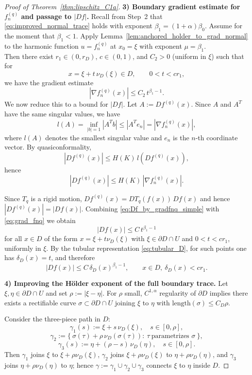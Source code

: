 \documentclass{amsart}
\begin{document}
\begin{proof}[Proof of Theorem~\ref{thm:lipschitz_C1a}]
\medskip
\noindent\textbf{3) Boundary gradient estimate for $f^{(q)}_n$ and passage to $|Df|$.}
Recall from Step~2 that \eqref{eq:improved_normal_trace} holds with exponent $\beta_1=(1+\alpha)\beta_0$.
Assume for the moment that $\beta_1<1$.
Apply Lemma~\ref{lem:anchored_holder_to_grad_normal} to the harmonic function $u=f^{(q)}_n$ at $x_0=\xi$
with exponent $\mu=\beta_1$.
\\
Then there exist
$r_1\in(0,r_D)$, $c\in(0,1)$, and $C_2>0$ (uniform in $\xi$) such that for
\[
x=\xi+t\,\nu_D(\xi)\in D,\qquad 0<t<c r_1,
\]
we have the gradient estimate
\begin{equation}\label{eq:grad_fnq}
|\nabla f^{(q)}_n(x)|\le C_2\, t^{\beta_1-1}.
\end{equation}
We now reduce this to a bound for $|Df|$. Let $A:=Df^{(q)}(x)$.
Since $A$ and $A^T$ have the same singular values, we have
\[
l(A)=\inf_{|b|=1}|A^Tb|\le |A^T e_n|=|\nabla f^{(q)}_n(x)|,
\]
where $l(A)$ denotes the smallest singular value and $e_n$ is the $n$-th coordinate vector. By quasiconformality,
\begin{equation}\label{eq:qc_distortion_again}
|Df^{(q)}(x)|\le H(K)\,l(Df^{(q)}(x)),
\end{equation}
hence
\begin{equation}\label{eq:Df_by_gradfnq_simple}
|Df^{(q)}(x)|\le H(K)\,|\nabla f^{(q)}_n(x)|.
\end{equation}

Since $T_q$ is a rigid motion, $Df^{(q)}(x)=DT_q(f(x))\,Df(x)$ and hence
$|Df^{(q)}(x)|=|Df(x)|$. Combining \eqref{eq:Df_by_gradfnq_simple} with
\eqref{eq:grad_fnq} we obtain
\[
|Df(x)|\le C\,t^{\beta_1-1}
\]
for all $x\in D$ of the form $x=\xi+t\nu_D(\xi)$ with $\xi\in\partial D\cap U$
and $0<t<c r_1$, uniformly in $\xi$. By the tubular representation
\eqref{eq:tubular_D}, for such points one has $\delta_D(x)=t$, and therefore
\begin{equation}\label{eq:Df_collar_in_terms_delta_new}
|Df(x)|\le C\,\delta_D(x)^{\beta_1-1},
\qquad x\in D,\ \delta_D(x)<c r_1.
\end{equation}


\medskip
\noindent\textbf{4) Improving the H\"older exponent of the full boundary trace.}
Let $\xi,\eta\in\partial D\cap U$ and set $\rho:=|\xi-\eta|$.
For $\rho$ small, $C^{1,\alpha}$ regularity of $\partial D$ implies there exists a rectifiable curve
$\sigma\subset \partial D\cap U$ joining $\xi$ to $\eta$ with $\mathrm{length}(\sigma)\le C_D\rho$.

Consider the three-piece path in $D$:
\[
\gamma_1(s):=\xi+s\,\nu_D(\xi),\quad s\in[0,\rho],
\]
\[
\gamma_2:=\{\ \sigma(\tau)+\rho\,\nu_D(\sigma(\tau)):\ \tau\ \text{parametrizes }\sigma\ \},
\]
\[
\gamma_3(s):=\eta+(\rho-s)\,\nu_D(\eta),\quad s\in[0,\rho].
\]
Then $\gamma_1$ joins $\xi$ to $\xi+\rho\nu_D(\xi)$, $\gamma_2$ joins $\xi+\rho\nu_D(\xi)$ to
$\eta+\rho\nu_D(\eta)$, and $\gamma_3$ joins $\eta+\rho\nu_D(\eta)$ to $\eta$; hence
$\gamma:=\gamma_1\cup\gamma_2\cup\gamma_3$ connects $\xi$ to $\eta$ inside $D$.


\end{proof}
\end{document}
